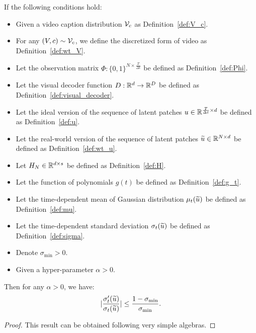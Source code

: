 \begin{lemma}\label{lem:bound_diff_sigma}
    If the following conditions hold:
    \begin{itemize}
        \item Given a video caption distribution ${\cal V}_c$ as Definition~\ref{def:V_c}.
        \item For any $(V, c) \sim {\cal V}_c$, we define the discretized form of video as Definition~\ref{def:wt_V}.
        \item Let the observation matrix $\Phi: \{0, 1\}^{N \times \frac{T}{\Delta t}}$ be defined as Definition~\ref{def:Phi}.
        \item Let the visual decoder function $D: \mathbb{R}^d \rightarrow \mathbb{R}^D$ be defined as Definition~\ref{def:visual_decoder}.
        \item Let the ideal version of the sequence of latent patches $u \in \mathbb{R}^{\frac{T}{\Delta t} \times d}$ be defined as Definition~\ref{def:u}.
        \item Let the real-world version of the sequence of latent patches $\widetilde{u} \in \mathbb{R}^{N \times d}$ be defined as Definition~\ref{def:wt_u}.
        \item Let $H_N \in \mathbb{R}^{d \times s}$ be defined as Definition~\ref{def:H}.
        \item Let the function of polynomials $g(t)$ be defined as Definition~\ref{def:g_t}.
        \item Let the time-dependent mean of Gaussian distribution $\mu_t(\widetilde{u})$ be defined as Definition~\ref{def:mu}.
        \item Let the time-dependent standard deviation $\sigma_t(\widetilde{u})$ be defined as Definition~\ref{def:sigma}.
        \item Denote $\sigma_{\min} > 0$.
        \item Given a hyper-parameter $\alpha > 0$.
    \end{itemize}
    Then for any $\alpha >0$, we have:
    \begin{align*}
        | \frac{\sigma_t'(\widetilde{u})}{\sigma_t(\widetilde{u})} | \leq \frac{1 - \sigma_{\min}}{\sigma_{\min}}.
    \end{align*}
\end{lemma}

\begin{proof}
    This result can be obtained following very simple algebras.
\end{proof}

